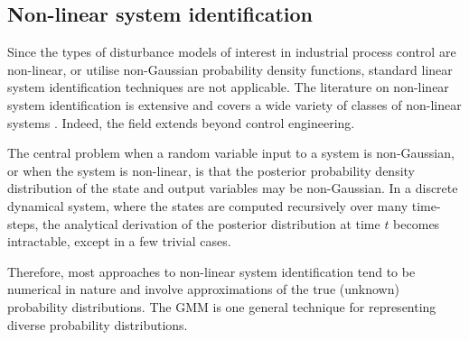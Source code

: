 \subsection{Non-linear system identification}

Since the types of disturbance models of interest in industrial process control are non-linear, or utilise non-Gaussian probability density functions, standard linear system identification techniques are not applicable. The literature on non-linear system identification is extensive and covers a wide variety of classes of non-linear systems \citep{schoukens_nonlinear_2019}. Indeed, the field extends beyond control engineering.


The central problem when a random variable input to a system is non-Gaussian, or when the system is non-linear, is that the posterior probability density distribution of the state and output variables may be non-Gaussian. In a discrete dynamical system, where the states are computed recursively over many time-steps, the analytical derivation of the posterior distribution at time $t$ becomes intractable, except in a few trivial cases.

Therefore, most approaches to non-linear system identification tend to be numerical in nature and involve approximations of the true (unknown) probability distributions. The \gls{GMM} is one general technique for representing diverse probability distributions.


